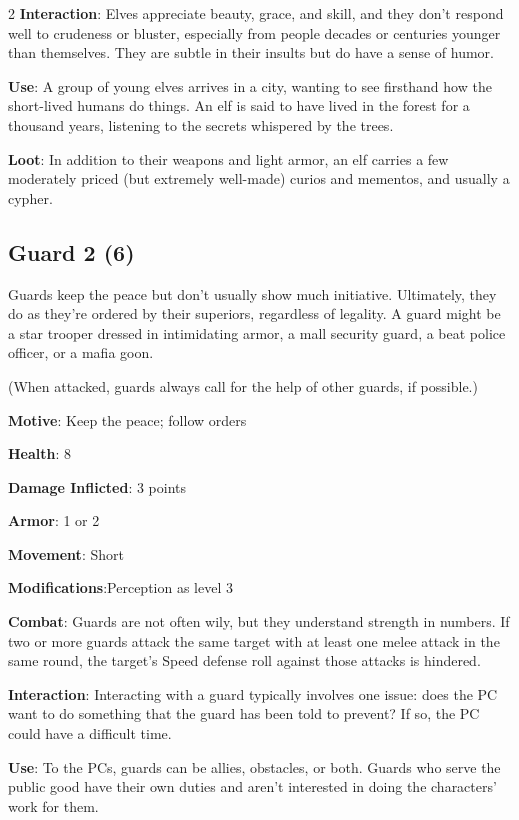 \begin{multicols}{2}
\textbf{Interaction}: Elves appreciate beauty, grace, and skill, and they don’t respond well to crudeness or bluster, especially from people decades or centuries younger than themselves. They are subtle in their insults but do have a sense of humor. 

\textbf{Use}: A group of young elves arrives in a city, wanting to see firsthand how the short-lived humans do things. An elf is said to have lived in the forest for a thousand years, listening to the secrets whispered by the trees.

\textbf{Loot}: In addition to their weapons and light armor, an elf carries a few moderately priced (but extremely well-made) curios and mementos, and usually a cypher.

\subsection{Guard	2 (6)}

Guards keep the peace but don’t usually show much initiative. Ultimately, they do as they’re ordered by their superiors, regardless of legality. A guard might be a star trooper dressed in intimidating armor, a mall security guard, a beat police officer, or a mafia goon.

(When attacked, guards always call for the help of other guards, if possible.)

\textbf{Motive}: Keep the peace; follow orders

\textbf{Health}: 8

\textbf{Damage Inflicted}: 3 points

\textbf{Armor}: 1 or 2

\textbf{Movement}: Short

\textbf{Modifications}:Perception as level 3

\textbf{Combat}: Guards are not often wily, but they understand strength in numbers. If two or more guards attack the same target with at least one melee attack in the same round, the target’s Speed defense roll against those attacks is hindered.

\textbf{Interaction}: Interacting with a guard typically involves one issue: does the PC want to do something that the guard has been told to prevent? If so, the PC could have a difficult time. 

\textbf{Use}: To the PCs, guards can be allies, obstacles, or both. Guards who serve the public good have their own duties and aren’t interested in doing the characters’ work for them.


\end{multicols}
